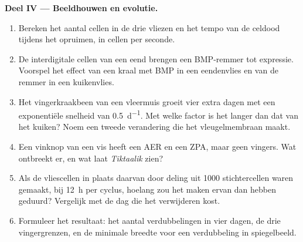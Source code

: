 \begin{problem}
\medskip
\noindent\textbf{Deel IV --- Beeldhouwen en evolutie.}
\begin{enumerate}[resume]
  \item Bereken het aantal cellen in de drie vliezen en het tempo van de
        celdood tijdens het opruimen, in cellen per seconde.
  \item De interdigitale cellen van een eend brengen een BMP-remmer tot
        expressie. Voorspel het effect van een kraal met BMP in een
        eendenvlies en van de remmer in een kuikenvlies.
  \item Het vingerkraakbeen van een vleermuis groeit vier extra dagen met
        een exponentiële snelheid van \qty{0.5}{d^{-1}}. Met welke factor is
        het langer dan dat van het kuiken? Noem een tweede verandering die
        het vleugelmembraan maakt.
  \item Een vinknop van een vis heeft een AER en een ZPA, maar geen vingers.
        Wat ontbreekt er, en wat laat \emph{Tiktaalik} zien?
  \item Als de vliescellen in plaats daarvan door deling uit \num{1000}
        stichtercellen waren gemaakt, bij \qty{12}{h} per cyclus, hoelang
        zou het maken ervan dan hebben geduurd? Vergelijk met de dag die het
        verwijderen kost.
  \item Formuleer het resultaat: het aantal verdubbelingen in vier dagen,
        de drie vingergrenzen, en de minimale breedte voor een verdubbeling
        in spiegelbeeld.
\end{enumerate}
\end{problem}
